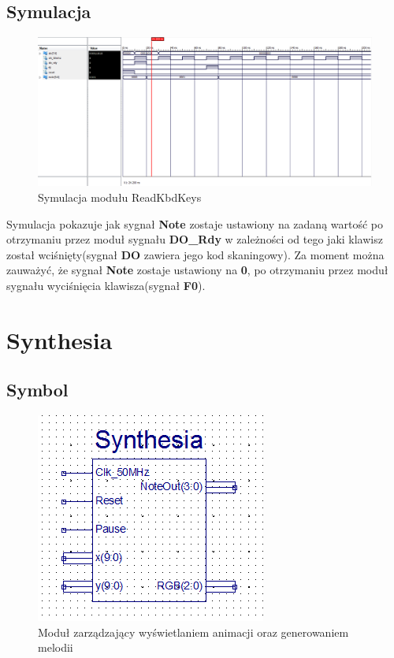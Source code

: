 \documentclass[a4paper]{report}
\begin{document}
		\begin{landscape}
			\subsection{Symulacja}
				\begin{figure}[h!]
					\centering
					\includegraphics[width=1.6\textwidth]{readkbdkeys_symulacja2.png}
					\caption{Symulacja modułu ReadKbdKeys}
				\end{figure}
			\justify
            Symulacja pokazuje jak sygnał \textbf{Note} zostaje ustawiony na zadaną wartość po otrzymaniu przez moduł sygnału \textbf{DO\_Rdy}
            w zależności od tego jaki klawisz został wciśnięty(sygnał \textbf{DO} zawiera jego kod skaningowy). Za moment można zauważyć, że 
            sygnał \textbf{Note} zostaje ustawiony na \textbf{0}, po otrzymaniu przez moduł sygnału wyciśnięcia klawisza(sygnał \textbf{F0}).
		\end{landscape}
		
		\newpage
	\section{Synthesia}
		\subsection{Symbol}
			\begin{figure}[h!]
				\centering
				\includegraphics{synthesia2.png}
				\caption{Moduł zarządzający wyświetlaniem animacji oraz generowaniem melodii}
			\end{figure}
\end{document}
